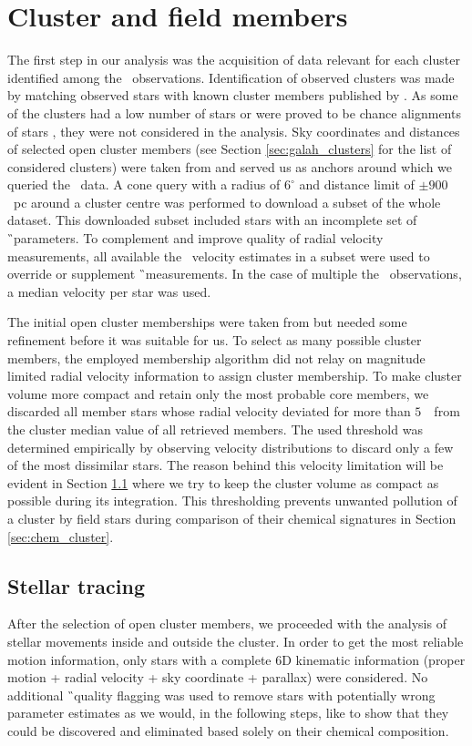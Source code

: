 \section{Cluster and field members}
\label{sec:membership_v2}
The first step in our analysis was the acquisition of data relevant for each cluster identified among the \Gh\ observations. Identification of observed clusters was made by matching observed stars with known cluster members published by \citet{2018A&A...618A..93C}. As some of the clusters had a low number of stars or were proved to be chance alignments of stars \cite{2018MNRAS.480.5242K}, they were not considered in the analysis. Sky coordinates and distances of selected open cluster members (see Section \ref{sec:galah_clusters} for the list of considered clusters) were taken from \citet{2018A&A...618A..93C} and served us as anchors around which we queried the \Gs\ data. A cone query with a radius of $6^\circ$ and distance limit of $\pm900$~pc around a cluster centre was performed to download a subset of the whole dataset. This downloaded subset included stars with an incomplete set of \G\ parameters. To complement and improve quality of radial velocity measurements, all available the \Gh\ velocity estimates in a subset were used to override or supplement \G\ measurements. In the case of multiple the \Gh\ observations, a median velocity per star was used.

The initial open cluster memberships were taken from \citet{2018A&A...618A..93C} but needed some refinement before it was suitable for us. To select as many possible cluster members, the employed membership algorithm did not relay on magnitude limited radial velocity information to assign cluster membership. To make cluster volume more compact and retain only the most probable core members, we discarded all member stars whose radial velocity deviated for more than $5$~\kms\ from the cluster median value of all retrieved members. The used threshold was determined empirically by observing velocity distributions to discard only a few of the most dissimilar stars. The reason behind this velocity limitation will be evident in Section \ref{sec:orbit_tracing} where we try to keep the cluster volume as compact as possible during its integration. This thresholding prevents unwanted pollution of a cluster by field stars during comparison of their chemical signatures in Section \ref{sec:chem_cluster}. 

\subsection{Stellar tracing}
\label{sec:orbit_tracing}
After the selection of open cluster members, we proceeded with the analysis of stellar movements inside and outside the cluster. In order to get the most reliable motion information, only stars with a complete 6D kinematic information (proper motion + radial velocity + sky coordinate + parallax) were considered. No additional \G\ quality flagging was used to remove stars with potentially wrong parameter estimates as we would, in the following steps, like to show that they could be discovered and eliminated based solely on their chemical composition.


